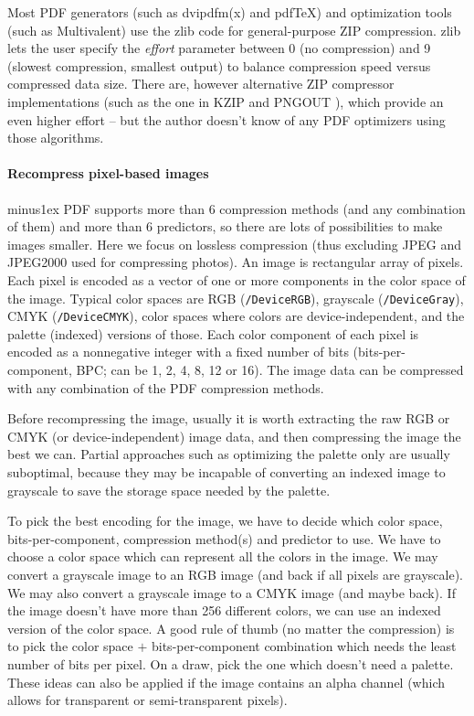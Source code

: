 \documentclass{ltugproc}
\def\cmd{\textsf}
\def\pkg{\textsf}
\newcommand\DD{\discretionary{\the \textfont 1\char"2E}{}{}}
\begin{document}
Most PDF generators (such as \cmd{dvipdfm(x)} and pdf\TeX{}) and
optimization tools (such as Multivalent)
use the \pkg{zlib} code for general-purpose ZIP compression.
\pkg{zlib} lets the user specify the \emph{effort} parameter between 0 (no
compression) and 9 (slowest compression, smallest output) to balance
compression speed versus compressed data size. There are, however
alternative ZIP compressor implementations (such as the one in
KZIP \cite{kzip} and PNGOUT \cite{pngout,pngout-linux}), which
provide an even higher effort -- but the author doesn't know of any PDF
optimizers using those algorithms.

\paragraph{Recompress pixel-based images}

\vrule width0pt \hskip0pt minus1ex  %
PDF supports more than 6 compression methods (and any combination of
them) and more than 6 predictors, so there are lots of possibilities to make
images smaller. Here we focus on lossless compression (thus excluding JPEG
and JPEG2000 used for compressing photos). An image is rectangular array of
pixels. Each pixel is encoded as a vector of one or more components in the
color space of the image. Typical color spaces are RGB
(\texttt{/DeviceRGB}), grayscale (\texttt{/Device\DD Gray}), CMYK
(\texttt{/DeviceCMYK}), color spaces where colors are device-independent,
and the palette (indexed) versions of those. Each color component of each
pixel is encoded as a nonnegative integer with a fixed number of bits
(bits-per-component, BPC; can be 1, 2, 4, 8, 12 or 16). The image data can be
compressed with any combination of the PDF compression methods.

Before recompressing the image, usually it is worth extracting the raw RGB or
CMYK (or device-independent) image data, and then compressing the image the
best we can. Partial approaches such as optimizing the palette only are
usually suboptimal, because they may be incapable of converting an indexed
image to grayscale to save the storage space needed by the palette.

To pick the best encoding for the image, we have to decide which color space,
bits-per-compo\-nent, compression method(s) and predictor to use. We have to
choose a color space which can represent all the colors in the image. We may
convert a grayscale image to an RGB image (and back if all pixels are
grayscale). We may also convert a grayscale image to a CMYK image (and maybe
back). If the image doesn't have more than 256 different colors, we can use
an indexed version of the color space. A good rule of thumb (no matter the
compression) is to pick the color space $+$ bits-per-component combination
which needs the least number of bits per pixel. On a draw, pick the one
which doesn't need a palette. These ideas can also be applied if the image
contains an alpha channel (which allows for transparent or semi-transparent
pixels).
\end{document}
